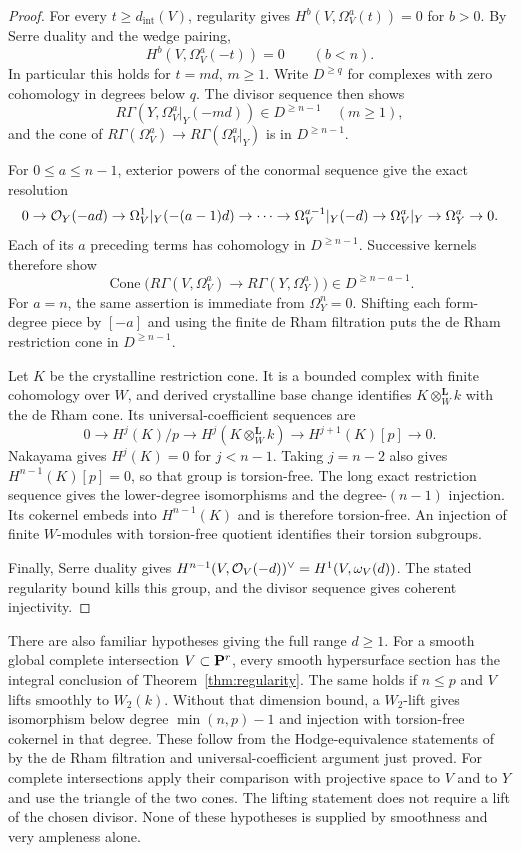 \begin{proof}
For every $t\ge d_{\mathrm{int}}(V)$, regularity gives
$H^b(V,\Omega_V^a(t))=0$ for $b>0$. By Serre duality and the wedge pairing,
\[
 H^b(V,\Omega_V^a(-t))=0\qquad(b<n).
\]
In particular this holds for $t=md$, $m\ge1$. Write $D^{\ge q}$ for complexes with zero cohomology in degrees below $q$. The divisor sequence then shows
\[
 R\Gamma(Y,\Omega_V^a|_Y(-md))\in D^{\ge n-1}\quad(m\ge1),
\]
and the cone of $R\Gamma(\Omega_V^a)\to R\Gamma(\Omega_V^a|_Y)$ is in $D^{\ge n-1}$.

For $0\le a\le n-1$, exterior powers of the conormal sequence give the exact resolution
\[
 0\to\mathcal O_Y(-ad)\to\Omega_V^1|_Y(-(a-1)d)\to\cdots
 \to\Omega_V^{a-1}|_Y(-d)\to\Omega_V^a|_Y\to\Omega_Y^a\to0.
\]
Each of its $a$ preceding terms has cohomology in $D^{\ge n-1}$. Successive kernels therefore show
\[
 \operatorname{Cone}\bigl(R\Gamma(V,\Omega_V^a)
                   \to R\Gamma(Y,\Omega_Y^a)\bigr)
 \in D^{\ge n-a-1}.
\]
For $a=n$, the same assertion is immediate from $\Omega_Y^n=0$. Shifting each form-degree piece by $[-a]$ and using the finite de Rham filtration puts the de Rham restriction cone in $D^{\ge n-1}$.

Let $K$ be the crystalline restriction cone. It is a bounded complex with finite cohomology over $W$, and derived crystalline base change identifies $K\otimes_W^{\mathbf L}k$ with the de Rham cone. Its universal-coefficient sequences are
\[
 0\to H^j(K)/p\to H^j(K\otimes_W^{\mathbf L}k)
                 \to H^{j+1}(K)[p]\to0.
\]
Nakayama gives $H^j(K)=0$ for $j<n-1$. Taking $j=n-2$ also gives $H^{n-1}(K)[p]=0$, so that group is torsion-free. The long exact restriction sequence gives the lower-degree isomorphisms and the degree-$(n-1)$ injection. Its cokernel embeds into $H^{n-1}(K)$ and is therefore torsion-free. An injection of finite $W$-modules with torsion-free quotient identifies their torsion subgroups.

Finally, Serre duality gives
$H^{n-1}(V,\mathcal O_V(-d))^\vee=H^1(V,\omega_V(d))$. The stated regularity bound kills this group, and the divisor sequence gives coherent injectivity.
\end{proof}

There are also familiar hypotheses giving the full range $d\ge1$. For a smooth global complete intersection $V\subset\mathbf P^r$, every smooth hypersurface section has the integral conclusion of Theorem~\ref{thm:regularity}. The same holds if $n\le p$ and $V$ lifts smoothly to $W_2(k)$. Without that dimension bound, a $W_2$-lift gives isomorphism below degree $\min(n,p)-1$ and injection with torsion-free cokernel in that degree. These follow from the Hodge-equivalence statements of \citet[Definition 2.2.1 and Theorem 2.2.3, pp.~1854--1855]{CotnerZavyalov} by the de Rham filtration and universal-coefficient argument just proved. For complete intersections apply their comparison with projective space to $V$ and to $Y$ and use the triangle of the two cones. The lifting statement does not require a lift of the chosen divisor. None of these hypotheses is supplied by smoothness and very ampleness alone.
